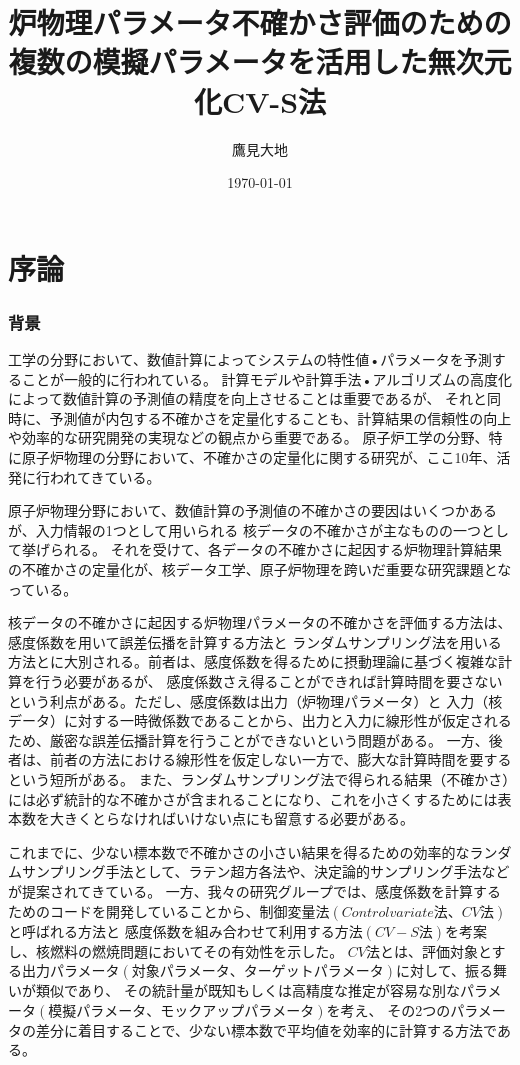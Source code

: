\documentclass[a4paper,11pt,titlepage,uplatex]{jsarticle}
\begin{document}
\title{炉物理パラメータ不確かさ評価のための複数の模擬パラメータを活用した無次元化CV-S法}
\author{鷹見大地}
\date{\today}
\maketitle

\tableofcontents
\clearpage

\part{序論}
\section{背景}
工学の分野において、数値計算によってシステムの特性値•パラメータを予測することが一般的に行われている。
計算モデルや計算手法•アルゴリズムの高度化によって数値計算の予測値の精度を向上させることは重要であるが、
それと同時に、予測値が内包する不確かさを定量化することも、計算結果の信頼性の向上や効率的な研究開発の実現などの観点から重要である。
原子炉工学の分野、特に原子炉物理の分野において、不確かさの定量化に関する研究が、ここ10年、活発に行われてきている。

原子炉物理分野において、数値計算の予測値の不確かさの要因はいくつかあるが、入力情報の1つとして用いられる
核データの不確かさが主なものの一つとして挙げられる。
それを受けて、各データの不確かさに起因する炉物理計算結果の不確かさの定量化が、核データ工学、原子炉物理を跨いだ重要な研究課題となっている。

核データの不確かさに起因する炉物理パラメータの不確かさを評価する方法は、感度係数を用いて誤差伝播を計算する方法と
ランダムサンプリング法を用いる方法とに大別される。前者は、感度係数を得るために摂動理論に基づく複雑な計算を行う必要があるが、
感度係数さえ得ることができれば計算時間を要さないという利点がある。ただし、感度係数は出力（炉物理パラメータ）と
入力（核データ）に対する一時微係数であることから、出力と入力に線形性が仮定されるため、厳密な誤差伝播計算を行うことができないという問題がある。
一方、後者は、前者の方法における線形性を仮定しない一方で、膨大な計算時間を要するという短所がある。
また、ランダムサンプリング法で得られる結果（不確かさ）には必ず統計的な不確かさが含まれることになり、これを小さくするためには表本数を大きくとらなければいけない点にも留意する必要がある。

これまでに、少ない標本数で不確かさの小さい結果を得るための効率的なランダムサンプリング手法として、ラテン超方各法や、決定論的サンプリング手法などが提案されてきている。
一方、我々の研究グループでは、感度係数を計算するためのコードを開発していることから、制御変量法$\left(Control variate法、CV法\right)$と呼ばれる方法と
感度係数を組み合わせて利用する方法$\left(CV-S法\right)$を考案し、核燃料の燃焼問題においてその有効性を示した。
$CV法$とは、評価対象とする出力パラメータ$\left(対象パラメータ、ターゲットパラメータ\right)$に対して、振る舞いが類似であり、
その統計量が既知もしくは高精度な推定が容易な別なパラメータ$\left(模擬パラメータ、モックアップパラメータ\right)$を考え、
その2つのパラメータの差分に着目することで、少ない標本数で平均値を効率的に計算する方法である。
\end{document}

